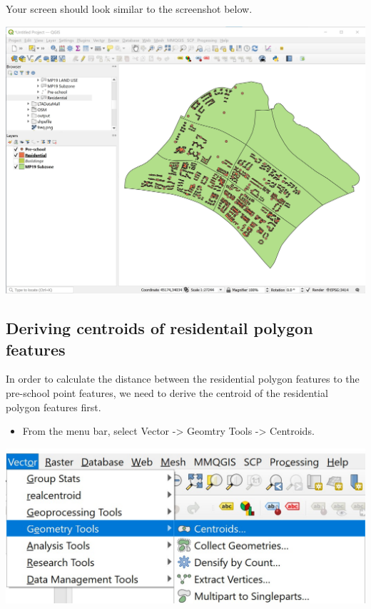 \documentclass[
  letterpaper,
  DIV=11,
  numbers=noendperiod]{scrreprt}
\providecommand{\tightlist}{%
  \setlength{\itemsep}{0pt}\setlength{\parskip}{0pt}}\usepackage{longtable,booktabs,array}
\begin{document}
Your screen should look similar to the screenshot below.

\includegraphics{./img04/image105.jpg}

\hypertarget{deriving-centroids-of-residentail-polygon-features}{%
\subsection{Deriving centroids of residentail polygon
features}\label{deriving-centroids-of-residentail-polygon-features}}

In order to calculate the distance between the residential polygon
features to the pre-school point features, we need to derive the
centroid of the residential polygon features first.

\begin{itemize}
\tightlist
\item
  From the menu bar, select Vector -\textgreater{} Geomtry Tools
  -\textgreater{} Centroids.
\end{itemize}

\includegraphics{./img04/image106.jpg}
\end{document}
